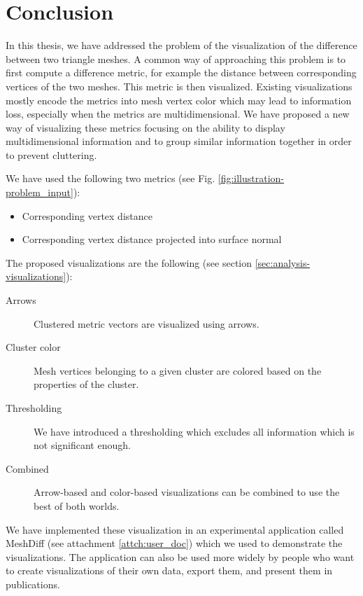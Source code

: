 \chapter*{Conclusion}

In this thesis, we have addressed the problem of the visualization of the difference between two triangle meshes. A common way of approaching this problem is to first compute a difference metric, for example the distance between corresponding vertices of the two meshes. This metric is then visualized. Existing visualizations mostly encode the metrics into mesh vertex color which may lead to information loss, especially when the metrics are multidimensional. We have proposed a new way of visualizing these metrics focusing on the ability to display multidimensional information and to group similar information together in order to prevent cluttering.

We have used the following two metrics (see Fig. \ref{fig:illustration-problem_input}):

\begin{itemize}
	\item Corresponding vertex distance	
	\item Corresponding vertex distance projected into surface normal
\end{itemize}

The proposed visualizations are the following (see section \ref{sec:analysis-visualizations}):

\begin{description}
	\item [Arrows] Clustered metric vectors are visualized using arrows.
	\item [Cluster color] Mesh vertices belonging to a given cluster are colored based on the properties of the cluster.
	\item [Thresholding] We have introduced a thresholding which excludes all information which is not significant enough.
	\item [Combined] Arrow-based and color-based visualizations can be combined to use the best of both worlds.
\end{description}

We have implemented these visualization in an experimental application called MeshDiff (see attachment \ref{attch:user_doc}) which we used to demonstrate the visualizations. The application can also be used more widely by people who want to create visualizations of their own data, export them, and present them in publications.

